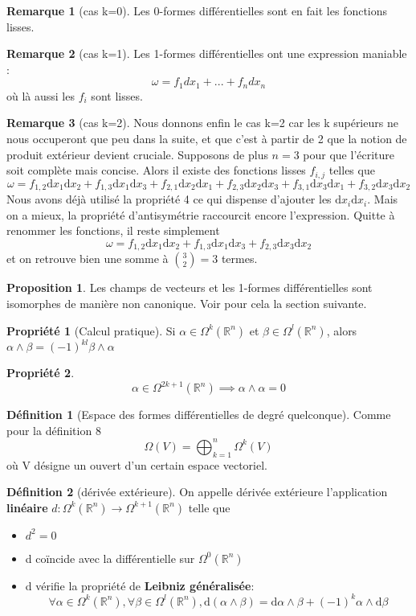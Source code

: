\documentclass{article}
\newcommand{\R}{\mathbb{R}} %
\theoremstyle{definition} %
\newtheorem{defi}{Définition}
\newtheorem{rmq}{Remarque}
\newtheorem{prop}{Proposition}
\newtheorem{propri}{Propriété}
\newcommand{\OM}[1]{\Omega^{#1} (\R^n)}
\newcommand{\dd}{ \mathrm{d}}
\newcommand{\1}{\mathbb{1}} %
\begin{document}
\begin{rmq}[cas k=0]
Les 0-formes différentielles sont en fait les fonctions lisses.
\end{rmq}
\begin{rmq}[cas k=1]
Les 1-formes différentielles ont une expression maniable : 
$$\omega = f_1 dx_1 + ... + f_ndx_n$$
où là aussi les $f_i$ sont lisses.
\end{rmq}
\begin{rmq}[cas k=2]
Nous donnons enfin le cas k=2 car les k supérieurs ne nous occuperont que peu dans la suite, et que c'est à partir de 2 que la notion de produit extérieur devient cruciale.
Supposons de plus $n=3$ pour que l'écriture soit complète mais concise. Alors il existe des fonctions lisses $f_{i,j}$ telles que
$$\omega = f_{1,2} \dd x_1 \dd x_2 + f_{1,3} \dd x_1 \dd x_3 + f_{2,1} \dd x_2 \dd x_1 + f_{2,3} \dd x_2 \dd x_3 + f_{3,1} \dd x_3 \dd x_1 + f_{3,2} \dd x_3 \dd x_2$$
Nous avons déjà utilisé la propriété 4 ce qui dispense d'ajouter les $\dd x_i \dd x_i$.
Mais on a mieux, la propriété d'antisymétrie raccourcit encore l'expression.
Quitte à renommer les fonctions, il reste simplement
$$\omega = f_{1,2} \dd x_1 \dd x_2 + f_{1,3} \dd x_1 \dd x_3 + f_{2,3} \dd x_3 \dd x_2  $$
et on retrouve bien une somme à $\binom{3}{2}=3$ termes.


\end{rmq}


\begin{prop}
Les champs de vecteurs et les 1-formes différentielles sont isomorphes de manière non canonique. Voir pour cela la section suivante.
\end{prop}
\begin{propri}[Calcul pratique]
Si $\alpha \in \Omega^k(\R^n) $ et $ \beta \in \Omega^l(\R^n)$, alors $ \alpha \wedge \beta = (-1)^{kl} \beta \wedge \alpha $
\end{propri}

\begin{propri}
$$ \alpha \in \OM{2k+1} \implies \alpha \wedge \alpha =0$$
\end{propri}

\begin{defi}[Espace des formes différentielles de degré quelconque]
Comme pour la définition 8
$$\Omega(V)=\bigoplus_{k=1}^{n} \Omega^k (V)$$
où V désigne un ouvert d'un certain espace vectoriel.
\end{defi}

\begin{defi}[dérivée extérieure]
On appelle dérivée extérieure l'application \textbf{linéaire} $d : \OM{k} \to \OM{k+1}$ telle que
\begin{itemize}
\item $d^2=0$
\item d coïncide avec la différentielle sur $\OM{0}$
\item d vérifie la propriété de \textbf{Leibniz généralisée}:
$$\forall \alpha \in \OM{k}, \forall \beta \in \OM{l}, \dd (\alpha \wedge \beta) = \dd \alpha \wedge \beta + (-1)^k \alpha \wedge \dd \beta$$
\end{itemize}
\end{defi}
\end{document}
